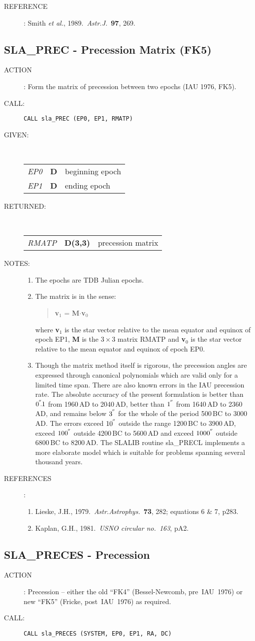 \documentclass[11pt,twoside]{article}
\newcommand{\xlabel}[1]{}
\newcommand{\arcsec}[2] {\arcseci{#1}$\hspace{-0.4em}.#2$}
\newcommand{\arcsec}[2] {
      {$#1\hspace{-0.05em}^{'\hspace{-0.1em}'}\hspace{-0.4em}.#2$}
   }
\newcommand{\arcseci}[1] {$#1\hspace{-0.05em}$\raisebox{-0.5ex}
                         {$^{'\hspace{-0.1em}'}$}}
\renewcommand{\arcseci}[1] {$#1\hspace{-0.05em}^{'\hspace{-0.1em}'}$}
\newcommand{\routine}[3]
{\hbadness=10000
  \vbox
  {
    \rule{\textwidth}{0.3mm}\\
    {\Large {\bf #1} \hfill #2 \hfill {\bf #1}}\\
    \setlength{\oldspacing}{\topsep}
    \setlength{\topsep}{0.3ex}
    \begin{description}
      #3
    \end{description}
    \setlength{\topsep}{\oldspacing}
  }
}
\renewcommand{\routine}[3]
   {
      \subsection{#1\xlabel{#1} - #2\label{#1}}
       \begin{description}
         #3
       \end{description}
   }
\newcommand{\action}[1]
{\item[ACTION]: #1}
\newcommand{\action}[1]
   {\item[ACTION:] #1}
\newcommand{\call}[1]
{\item[CALL]: \hspace{0.4em}{\tt #1}}
\newlength{\oldspacing}
\renewcommand{\call}[1]
   {
    \item[CALL:] {\tt #1}
   }
\newcommand{\args}[2]
{
  \goodbreak
  \setlength{\oldspacing}{\topsep}
  \setlength{\topsep}{0.3ex}
  \begin{description}
  \item[#1]:\\[1.5ex]
    \begin{tabular}{p{7em}p{6em}p{22em}}
      #2
    \end{tabular}
  \end{description}
  \setlength{\topsep}{\oldspacing}
}
\renewcommand{\args}[2]
   {
     \begin{description}
        \item[#1:]\\
        \begin{tabular}{p{7em}p{6em}l}
           #2
        \end{tabular}
     \end{description}
   }
\newcommand{\spec}[3]
{
  {\em {#1}} & {\bf \mbox{#2}} & {#3}
}
\newcommand{\notes}[1]
{
  \goodbreak
  \setlength{\oldspacing}{\topsep}
  \setlength{\topsep}{0.3ex}
  \begin{description}
    \item[NOTES]:
        #1
  \end{description}
  \setlength{\topsep}{\oldspacing}
}
\renewcommand{\notes}[1]
   {
      \begin{description}
         \item[NOTES:]
            #1
      \end{description}
   }
\newcommand{\aref}[1]
{
  \goodbreak
  \setlength{\oldspacing}{\topsep}
  \setlength{\topsep}{0.3ex}
  \begin{description}
    \item[REFERENCE]:
        #1
  \end{description}
  \setlength{\topsep}{\oldspacing}
}
\newcommand{\aref}[1]
   {
     \begin{description}
       \item[REFERENCE:]
           #1
     \end{description}
   }
\newcommand{\refs}[1]
{
  \goodbreak
  \setlength{\oldspacing}{\topsep}
  \setlength{\topsep}{0.3ex}
  \begin{description}
    \item[REFERENCES]:
        #1
  \end{description}
  \setlength{\topsep}{\oldspacing}
}
\newcommand{\refs}[1]
   {
     \begin{description}
       \item[REFERENCES:]
           #1
     \end{description}
   }
\begin{document}
\aref{Smith {\it et al.}, 1989.\ {\it Astr.J.}\ {\bf 97}, 269.}
\routine{SLA\_PREC}{Precession Matrix (FK5)}
{
 \action{Form the matrix of precession between two epochs (IAU 1976, FK5).}
 \call{CALL sla\_PREC (EP0, EP1, RMATP)}
}
\args{GIVEN}
{
 \spec{EP0}{D}{beginning epoch} \\
 \spec{EP1}{D}{ending epoch}
}
\args{RETURNED}
{
 \spec{RMATP}{D(3,3)}{precession matrix}
}
\notes
{
 \begin{enumerate}
  \item The epochs are TDB Julian epochs.
  \item The matrix is in the sense:
        \begin{verse}
         {\bf v}$_{1}$ =  {\bf M}$\cdot${\bf v}$_{0}$
        \end{verse}
        where {\bf v}$_{1}$ is the star vector relative to the
        mean equator and equinox of epoch EP1, {\bf M} is the
        $3\times3$ matrix RMATP and
        {\bf v}$_{0}$ is the star vector relative to the
        mean equator and equinox of epoch EP0.
  \item Though the matrix method itself is rigorous, the precession
        angles are expressed through canonical polynomials which are
        valid only for a limited time span.  There are also known
        errors in the IAU precession rate.  The absolute accuracy
        of the present formulation is better than \arcsec{0}{1} from
        1960\,AD to 2040\,AD, better than \arcseci{1} from 1640\,AD to 2360\,AD,
        and remains below \arcseci{3} for the whole of the period
        500\,BC to 3000\,AD.  The errors exceed \arcseci{10} outside the
        range 1200\,BC to 3900\,AD, exceed \arcseci{100} outside 4200\,BC to
        5600\,AD and exceed \arcseci{1000} outside 6800\,BC to 8200\,AD.
        The SLALIB routine sla\_PRECL implements a more elaborate
        model which is suitable for problems spanning several
        thousand years.
 \end{enumerate}
}
\refs
{
 \begin{enumerate}
  \item Lieske, J.H., 1979.\ {\it Astr.Astrophys.}\ {\bf 73}, 282;
        equations 6 \& 7, p283.
  \item Kaplan, G.H., 1981.\ {\it USNO circular no.\ 163}, pA2.
 \end{enumerate}
}
\routine{SLA\_PRECES}{Precession}
{
 \action{Precession -- either the old ``FK4'' (Bessel-Newcomb, pre~IAU~1976)
         or new ``FK5'' (Fricke, post~IAU~1976) as required.}
 \call{CALL sla\_PRECES (SYSTEM, EP0, EP1, RA, DC)}
}
\end{document}

